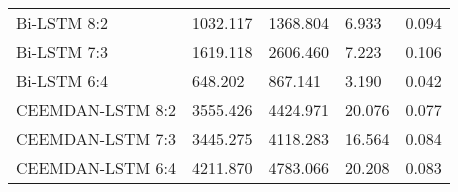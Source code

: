 \documentclass{ieeeojies}
\begin{document}
\begin{table}[H]
\begin{tabular}{lp{1.1cm}p{1.2cm}p{1cm}p{0.9cm}}
\cellcolor{firstcolcolor} Bi-LSTM 8:2 & 1032.117 & 1368.804 & 6.933 & 0.094 \\
\cellcolor{firstcolcolor} Bi-LSTM 7:3 & 1619.118 & 2606.460 & 7.223 & 0.106 \\
\cellcolor{firstcolcolor} Bi-LSTM 6:4 & 648.202 & 867.141 & 3.190 & 0.042 \\
\cellcolor{firstcolcolor} CEEMDAN-LSTM 8:2 & 3555.426 & 4424.971 & 20.076 & 0.077\\
\cellcolor{firstcolcolor} CEEMDAN-LSTM 7:3 & 3445.275 & 4118.283 & 16.564 & 0.084\\
\cellcolor{firstcolcolor} CEEMDAN-LSTM 6:4 & 4211.870 & 4783.066 & 20.208 & 0.083\\
\hline

\end{tabular}
\end{table}
\end{document}
